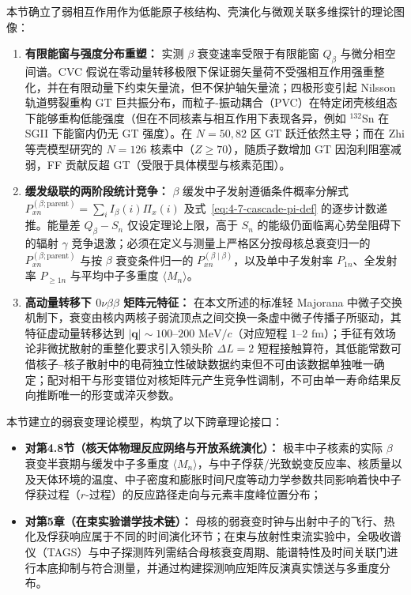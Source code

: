 本节确立了弱相互作用作为低能原子核结构、壳演化与微观关联多维探针的理论图像：
\begin{enumerate}
\item \textbf{有限能窗与强度分布重塑：} 实测 $\beta$ 衰变速率受限于有限能窗 $Q_\beta$ 与微分相空间谱。CVC 假说在零动量转移极限下保证弱矢量荷不受强相互作用强重整化，并在有限动量下约束矢量流，但不保护轴矢量流；四极形变引起 Nilsson 轨道劈裂重构 GT 巨共振分布，而粒子-振动耦合（PVC）在特定闭壳核组态下能够重构低能强度（但在不同核素与相互作用下表现各异，例如 $^{132}\mathrm{Sn}$ 在 SGII 下能窗内仍无 GT 强度）。在 $N=50, 82$ 区 GT 跃迁依然主导；而在 Zhi 等壳模型研究的 $N=126$ 核素中（$Z \ge 70$），随质子数增加 GT 因泡利阻塞减弱，FF 贡献反超 GT（受限于具体模型与核素范围）。
\item \textbf{缓发级联的两阶段统计竞争：} $\beta$ 缓发中子发射遵循条件概率分解式 $P_{xn}^{(\beta;\mathrm{parent})} = \sum_i I_\beta(i) \Pi_x(i)$ 及式~\eqref{eq:4-7-cascade-pi-def} 的逐步计数递推。能量差 $Q_\beta - S_n$ 仅设定理论上限，高于 $S_n$ 的能级仍面临离心势垒阻碍下的辐射 $\gamma$ 竞争退激；必须在定义与测量上严格区分按母核总衰变归一的 $P_{xn}^{(\beta;\mathrm{parent})}$ 与按 $\beta$ 衰变条件归一的 $P_{xn}^{(\beta\mid\beta)}$，以及单中子发射率 $P_{1n}$、全发射率 $P_{\ge 1n}$ 与平均中子多重度 $\langle M_n \rangle$。
\item \textbf{高动量转移下 $0\nu\beta\beta$ 矩阵元特征：} 在本文所述的标准轻 Majorana 中微子交换机制下，衰变由核内两核子弱流顶点之间交换一条虚中微子传播子所驱动，其特征虚动量转移达到 $|\mathbf{q}| \sim 100\text{--}200\text{ MeV}/c$（对应短程 $1\text{--}2\text{ fm}$）；手征有效场论非微扰散射的重整化要求引入领头阶 $\Delta L = 2$ 短程接触算符，其低能常数可借核子--核子散射中的电荷独立性破缺数据约束但不可由该数据单独唯一确定；配对相干与形变错位对核矩阵元产生竞争性调制，不可由单一寿命结果反向推断唯一的形变或淬灭参数。
\end{enumerate}

本节建立的弱衰变理论模型，构筑了以下跨章理论接口：
\begin{itemize}
\item \textbf{对第4.8节（核天体物理反应网络与开放系统演化）：} 极丰中子核素的实际 $\beta$ 衰变半衰期与缓发中子多重度 $\langle M_n \rangle$，与中子俘获/光致蜕变反应率、核质量以及天体环境的温度、中子密度和膨胀时间尺度等动力学参数共同影响着快中子俘获过程（$r$-过程）的反应路径走向与元素丰度峰位置分布；
\item \textbf{对第5章（在束实验谱学技术链）：} 母核的弱衰变时钟与出射中子的飞行、热化及俘获响应属于不同的时间演化环节；在束与放射性束流实验中，全吸收谱仪（TAGS）与中子探测阵列需结合母核衰变周期、能谱特性及时间关联门进行本底抑制与符合测量，并通过构建探测响应矩阵反演真实馈送与多重度分布。
\end{itemize}
